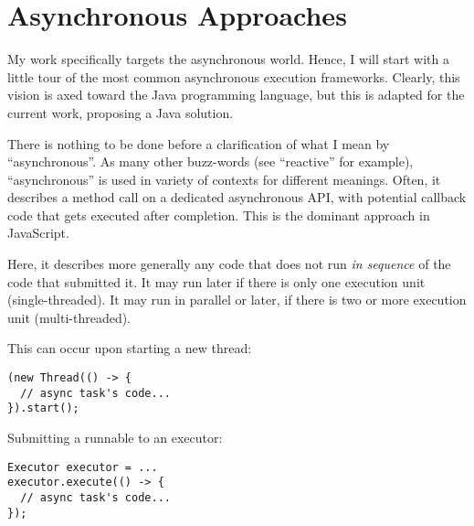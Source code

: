 
\chapter{Asynchronous Approaches}
\label{ch:asyncworld}


My work specifically targets the asynchronous world. Hence, I will start with a little tour of the most common asynchronous execution frameworks. Clearly, this vision is axed toward the Java programming language, but this is adapted for the current work, proposing a Java solution.

There is nothing to be done before a clarification of what I mean by ``asynchronous''. As many other buzz-words (see ``reactive'' for example), ``asynchronous'' is used in variety of contexts for different meanings. Often, it describes a method call on a dedicated asynchronous API, with potential callback code that gets executed after completion. This is the dominant approach in JavaScript.

Here, it describes more generally any code that does not run \emph{in sequence} of the code that submitted it. It may run later if there is only one execution unit (single-threaded). It may run in parallel or later, if there is two or more execution unit (multi-threaded).

This can occur upon starting a new thread:

\begin{lstlisting}
(new Thread(() -> {
  // async task's code...
}).start();
\end{lstlisting}

Submitting a runnable to an executor:

\begin{lstlisting}
Executor executor = ...
executor.execute(() -> {
  // async task's code...
});
\end{lstlisting}

